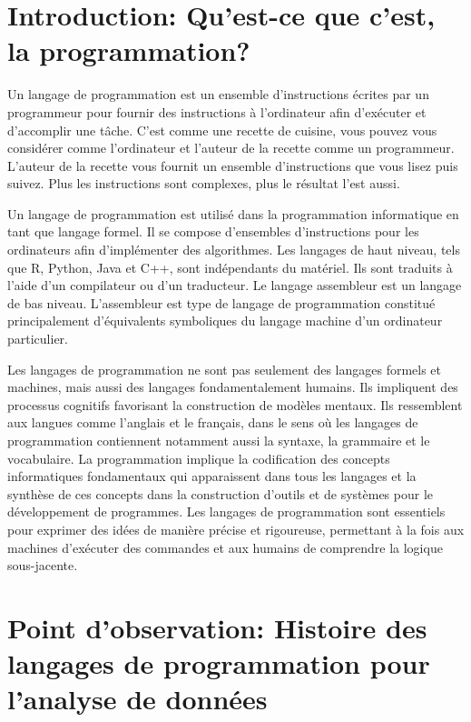 \documentclass[
  letterpaper,
  DIV=11,
  numbers=noendperiod]{scrreprt}
\begin{document}
\section{Introduction: Qu'est-ce que c'est, la
programmation?}\label{introduction-quest-ce-que-cest-la-programmation}

Un langage de programmation est un ensemble d'instructions écrites par
un programmeur pour fournir des instructions à l'ordinateur afin
d'exécuter et d'accomplir une tâche. C'est comme une recette de cuisine,
vous pouvez vous considérer comme l'ordinateur et l'auteur de la recette
comme un programmeur. L'auteur de la recette vous fournit un ensemble
d'instructions que vous lisez puis suivez. Plus les instructions sont
complexes, plus le résultat l'est aussi.

Un langage de programmation est utilisé dans la programmation
informatique en tant que langage formel. Il se compose d'ensembles
d'instructions pour les ordinateurs afin d'implémenter des algorithmes.
Les langages de haut niveau, tels que R, Python, Java et C++, sont
indépendants du matériel. Ils sont traduits à l'aide d'un compilateur ou
d'un traducteur. Le langage assembleur est un langage de bas niveau.
L'assembleur est type de langage de programmation constitué
principalement d'équivalents symboliques du langage machine d'un
ordinateur particulier.

Les langages de programmation ne sont pas seulement des langages formels
et machines, mais aussi des langages fondamentalement humains. Ils
impliquent des processus cognitifs favorisant la construction de modèles
mentaux. Ils ressemblent aux langues comme l'anglais et le français,
dans le sens où les langages de programmation contiennent notamment
aussi la syntaxe, la grammaire et le vocabulaire. La programmation
implique la codification des concepts informatiques fondamentaux qui
apparaissent dans tous les langages et la synthèse de ces concepts dans
la construction d'outils et de systèmes pour le développement de
programmes. Les langages de programmation sont essentiels pour exprimer
des idées de manière précise et rigoureuse, permettant à la fois aux
machines d'exécuter des commandes et aux humains de comprendre la
logique sous-jacente.

\section{Point d'observation: Histoire des langages de programmation
pour l'analyse de
données}\label{point-dobservation-histoire-des-langages-de-programmation-pour-lanalyse-de-donnuxe9es}
\end{document}

